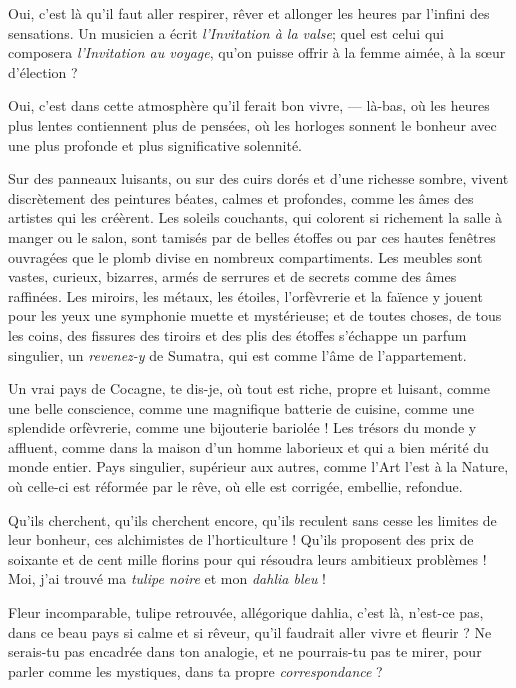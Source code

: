 Oui, c’est là qu’il faut aller
respirer, rêver et allonger les heures par l’infini
des sensations. Un musicien a écrit \textit{l’Invitation à la
valse}; quel est celui qui composera \textit{l’Invitation au
voyage}, qu’on puisse offrir à la femme aimée, à la
s\oe ur d’élection ?

\quebra

Oui, c’est dans cette atmosphère qu’il
ferait bon vivre, --- là{}-bas, où les heures plus lentes contiennent
plus de pensées, où les horloges sonnent le bonheur avec une plus
profonde et plus significative solennité.

Sur des panneaux luisants, ou sur des cuirs dorés et
d’une richesse sombre, vivent discrètement des
peintures béates, calmes et profondes, comme les âmes des artistes qui
les créèrent. Les soleils couchants, qui colorent si richement la salle
à manger ou le salon, sont tamisés par de belles étoffes ou par ces
hautes fenêtres ouvragées que le plomb divise en nombreux
compartiments. Les meubles sont vastes, curieux, bizarres, armés de
serrures et de secrets comme des âmes raffinées. Les miroirs, les
métaux, les étoiles, l’orfèvrerie et la faïence y
jouent pour les yeux une symphonie muette et mystérieuse; et de toutes
choses, de tous les coins, des fissures des tiroirs et des plis des
étoffes s’échappe un parfum singulier, un \textit{revenez{}-y}
de Sumatra, qui est comme l’âme de
l’appartement.

Un vrai pays de Cocagne, te dis{}-je, où tout est riche, propre et
luisant, comme une belle conscience, comme une magnifique batterie de
cuisine, comme une splendide orfèvrerie, comme une bijouterie bariolée
! Les trésors du monde y affluent, comme dans la maison
d’un homme laborieux et qui a bien mérité du monde
entier. Pays singulier, supérieur aux autres, comme
l’Art l’est à la Nature, où
celle{}-ci est réformée par le rêve, où elle est corrigée, embellie,
refondue.

Qu’ils cherchent, qu’ils cherchent
encore, qu’ils reculent sans cesse les limites de leur
bonheur, ces alchimistes de l’horticulture !
Qu’ils proposent des prix de soixante et de cent mille
florins pour qui résoudra leurs ambitieux problèmes ! Moi,
j’ai trouvé ma \textit{tulipe noire} et mon \textit{dahlia bleu} !

Fleur incomparable, tulipe retrouvée, allégorique dahlia,
c’est là, n’est{}-ce pas, dans ce
beau pays si calme et si rêveur, qu’il faudrait aller
vivre et fleurir ? Ne serais{}-tu pas encadrée dans ton analogie, et ne
pourrais{}-tu pas te mirer, pour parler comme les mystiques, dans ta
propre \textit{correspondance} ?

